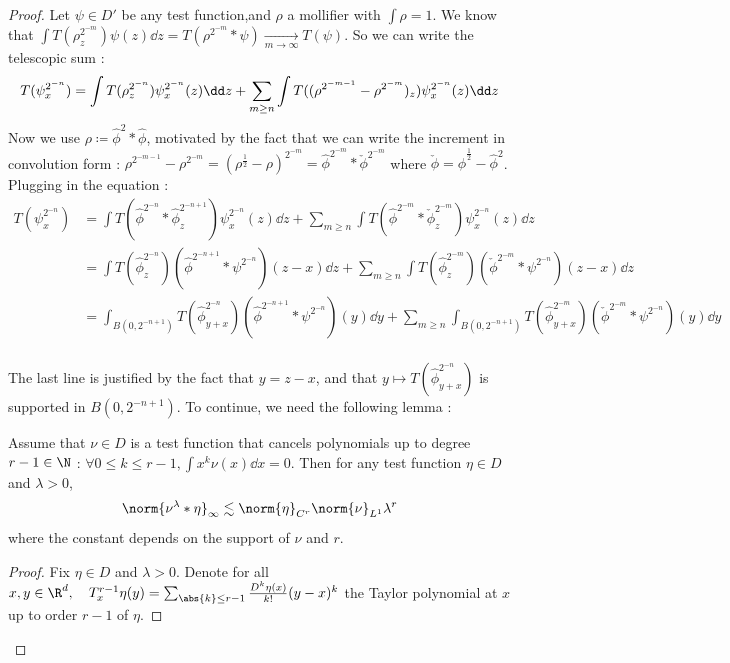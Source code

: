 \begin{proof}
    Let $\psi \in D'$ be any test function,and $\rho$ a mollifier with $\int \rho = 1$.
    We know that $\int T(\rho^{2^{-m}}_z) \psi (z)  \dd z  = T(\rho^{2^{-m}}*\psi) \xrightarrow[m \to \infty]{} T(\psi)$.
    So we can write the telescopic sum :
    \begin{equation*}
        T(\psi^{2^{-n}}_x) = \int T(\rho^{2^{-n}}_z) \psi^{2^{-n}}_x (z) \dd z + \sum_{m\geq n} \int T((\rho^{2^{-m-1}} - \rho^{2^{-m}})_z) \psi^{2^{-n}}_x (z) \dd z \\
    \end{equation*}
    Now we use $\rho \coloneq \hat{\phi}^2*\hat{\phi}$, motivated by the fact that we can write the increment in convolution form : $\rho^{2^{-m-1}} - \rho^{2^{-m}} = (\rho^{\frac{1}{2}} - \rho)^{2^{-m}} = \hat{\phi}^{2^{-m}}*\check{\phi}^{2^{-m}}$ where $\check{\phi}= \hat{\phi}^{\frac{1}{2}} - \hat{\phi}^2$.
    Plugging in the equation :
    \begin{align*}
        T(\psi^{2^{-n}}_x) &= \int T(\hat{\phi}^{2^{-n}}*\hat{\phi}^{2^{-n+1}}_z) \psi^{2^{-n}}_x (z) \dd z + \sum_{m\geq n} \int T(\hat{\phi}^{2^{-m}}*\check{\phi}^{2^{-m}}_z) \psi^{2^{-n}}_x (z) \dd z \\
        &= \int T(\hat{\phi}^{2^{-n}}_z) (\hat{\phi}^{2^{-n+1}}*\psi^{2^{-n}}) (z - x) \dd z + \sum_{m\geq n} \int T(\hat{\phi}^{2^{-m}}_z) (\check{\phi}^{2^{-m}}*\psi^{2^{-n}}) (z - x) \dd z \\
        &= \int_{B(0,2^{-n+1})} T(\hat{\phi}^{2^{-n}}_{y+x}) (\hat{\phi}^{2^{-n+1}}*\psi^{2^{-n}}) (y) \dd y + \sum_{m\geq n} \int_{B(0,2^{-n+1})} T(\hat{\phi}^{2^{-m}}_{y+x}) (\check{\phi}^{2^{-m}}*\psi^{2^{-n}}) (y) \dd y  \\
    \end{align*}

    The last line is justified by the fact that $y =z - x$, and that $y \mapsto T(\hat{\phi}^{2^{-n}}_{y+x})$ is supported in $B(0,2^{-n+1})$.
    To continue, we need the following lemma :
    \begin{lemma}
    \label{lem:technique2}
    Assume that $\nu \in D$ is a test function that cancels polynomials up to degree $r-1 \in \N$ : $\forall 0\leq k \leq r-1, \int x^k \nu(x) \dd x =0$.
    Then for any test function $\eta \in D$ and $\lambda >0$,
    \begin{equation*}
        \norm{\nu^\lambda *\eta }_\infty \lesssim \norm{\eta}_{C^r} \norm{\nu}_{L^1} \lambda^r
    \end{equation*}
    where the constant depends on the support of $\nu$ and $r$.
    \end{lemma}
    \begin{proof}
        Fix $\eta \in D$ and $\lambda >0$.
        Denote for all $x,y \in \R^d, \quad T_x^{r-1}\eta (y) = \sum_{\abs{k}\leq r-1 } \frac{D^k \eta (x)}{k!} (y-x)^k$ the Taylor polynomial at $x$ up to order $r-1$ of $\eta$.
        

\end{proof}
\end{proof}
